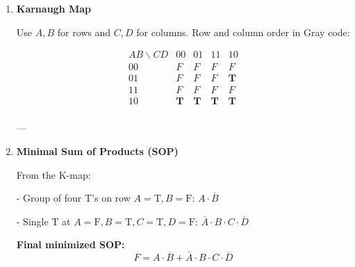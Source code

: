 \documentclass{article}
\begin{document}
\begin{enumerate}[label=\roman*.]
\item \textbf{Karnaugh Map}

Use \( A, B \) for rows and \( C, D \) for columns. Row and column order in Gray code:

\[
\begin{array}{c|cccc}
AB \backslash CD & 00 & 01 & 11 & 10 \\
\hline
00 & F & F & F & F \\
01 & F & F & F & \textbf{T} \\
11 & F & F & F & F \\
10 & \textbf{T} & \textbf{T} & \textbf{T} & \textbf{T} \\
\end{array}
\]

---

\item \textbf{Minimal Sum of Products (SOP)}

From the K-map:

- Group of four T's on row \( A = \text{T}, B = \text{F} \):  
  \( A \cdot \overline{B} \)

- Single T at \( A = \text{F}, B = \text{T}, C = \text{T}, D = \text{F} \):  
  \( \overline{A} \cdot B \cdot C \cdot \overline{D} \)

\textbf{Final minimized SOP:}
\[
\boxed{F = A \cdot \overline{B} + \overline{A} \cdot B \cdot C \cdot \overline{D}}
\]

\end{enumerate}
\end{document}
